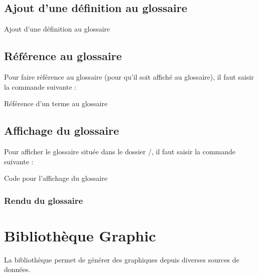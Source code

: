 {\section{Ajout d'une définition au glossaire}

\begin{Latex}{Ajout d'une définition au glossaire}
\end{Latex}

\section{Référence au glossaire}

Pour faire référence au glossaire (pour qu'il soit affiché au glossaire), il faut saisir la commande suivante : \\
\begin{Latex}{Référence d'un terme au glossaire}
\end{Latex}


\section{Affichage du glossaire}

Pour afficher le glossaire située dans le dossier /, il faut saisir la commande suivante : \\

\begin{Latex}{Code pour l'affichage du glossaire}
\end{Latex}

\subsection{Rendu du glossaire}

\chapter{Bibliothèque Graphic}

La bibliothèque  permet de générer des graphiques depuis diverses sources de données.

}

